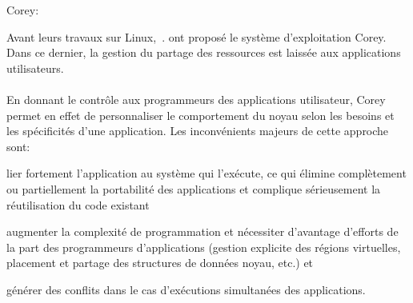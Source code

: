       \begin{paragraph}{Corey:}

        Avant leurs travaux sur Linux,~\citet{boyd2008corey}. ont proposé le
        système d’exploitation Corey. Dans ce dernier, la gestion du partage des
        ressources est laissée aux applications utilisateurs.\\

        \\

        En donnant le contrôle aux programmeurs des applications utilisateur,
        Corey permet en effet de personnaliser le comportement du noyau selon
        les besoins et les spécificités d’une application. Les inconvénients
        majeurs de cette approche sont: \benumline \item lier fortement
        l’application au système qui l’exécute, ce qui élimine complètement ou
        partiellement la portabilité des applications et complique sérieusement
        la réutilisation du code existant \item augmenter la complexité de
        programmation et nécessiter d’avantage d’efforts de la part des
        programmeurs d’applications (gestion explicite des régions virtuelles,
        placement et partage des structures de données noyau, etc.) et \item
        générer des conflits dans le cas d'exécutions simultanées des
        applications\eenumline.

      \end{paragraph}

